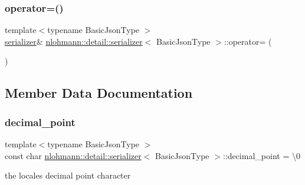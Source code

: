 \subsubsection{\texorpdfstring{operator=()}{operator=()}\hspace{0.1cm}{\footnotesize\ttfamily [2/2]}}
{\footnotesize\ttfamily template$<$typename Basic\+Json\+Type $>$ \\
\mbox{\hyperlink{classnlohmann_1_1detail_1_1serializer}{serializer}}\& \mbox{\hyperlink{classnlohmann_1_1detail_1_1serializer}{nlohmann\+::detail\+::serializer}}$<$ Basic\+Json\+Type $>$\+::operator= (\begin{DoxyParamCaption}\item[{\mbox{\hyperlink{classnlohmann_1_1detail_1_1serializer}{serializer}}$<$ Basic\+Json\+Type $>$ \&\&}]{ }\end{DoxyParamCaption})\hspace{0.3cm}{\ttfamily [delete]}}



\subsection{Member Data Documentation}
\mbox{\label{classnlohmann_1_1detail_1_1serializer_a311e5d6f4b31d5be0eb3c0cb20b6965a}} 
\subsubsection{\texorpdfstring{decimal\_point}{decimal\_point}}
{\footnotesize\ttfamily template$<$typename Basic\+Json\+Type $>$ \\
const char \mbox{\hyperlink{classnlohmann_1_1detail_1_1serializer}{nlohmann\+::detail\+::serializer}}$<$ Basic\+Json\+Type $>$\+::decimal\+\_\+point = \textquotesingle{}\textbackslash{}0\textquotesingle{}\hspace{0.3cm}{\ttfamily [private]}}



the locale\textquotesingle{}s decimal point character 

\mbox{\label{classnlohmann_1_1detail_1_1serializer_a09d5a046fb0f7cb61977d6e5fbe8b3a1}} 
